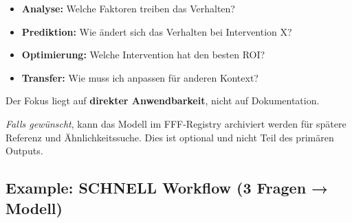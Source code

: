 \begin{tcolorbox}[colback=green!5!white, colframe=green!75!black,
    title=Was das Modell liefert]
\begin{itemize}[nosep]
\item \textbf{Analyse:} Welche Faktoren treiben das Verhalten?
\item \textbf{Prediktion:} Wie ändert sich das Verhalten bei Intervention X?
\item \textbf{Optimierung:} Welche Intervention hat den besten ROI?
\item \textbf{Transfer:} Wie muss ich anpassen für anderen Kontext?
\end{itemize}

Der Fokus liegt auf \textbf{direkter Anwendbarkeit}, nicht auf Dokumentation.
\end{tcolorbox}

\begin{tcolorbox}[colback=gray!5!white, colframe=gray!50!black,
    title=Optional: Registry-Speicherung]
\textit{Falls gewünscht}, kann das Modell im FFF-Registry archiviert werden
für spätere Referenz und Ähnlichkeitssuche. Dies ist optional und nicht
Teil des primären Outputs.
\end{tcolorbox}


\subsection{Example: SCHNELL Workflow (3 Fragen → Modell)}

